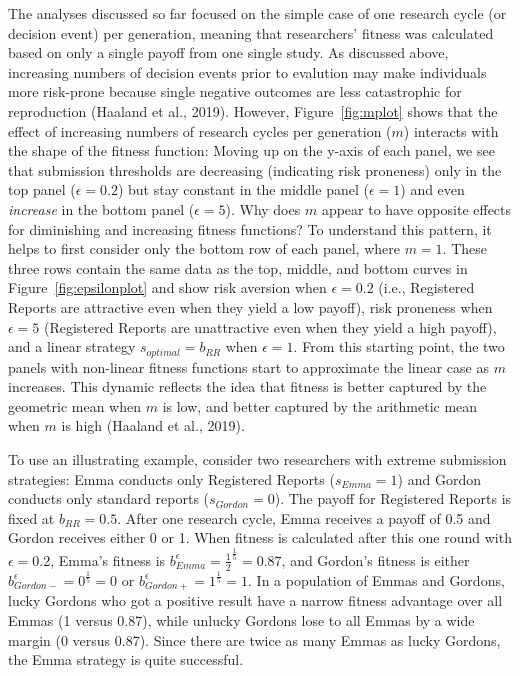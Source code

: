 \documentclass[british,,doc,mask,floatsintext]{apa6}
\begin{document}
The analyses discussed so far focused on the simple case of one research cycle (or decision event) per generation, meaning that researchers' fitness was calculated based on only a single payoff from one single study.
As discussed above, increasing numbers of decision events prior to evalution may make individuals more risk-prone because single negative outcomes are less catastrophic for reproduction (Haaland et al., 2019).
However, Figure~\ref{fig:mplot} shows that the effect of increasing numbers of research cycles per generation (\(m\)) interacts with the shape of the fitness function:
Moving up on the y-axis of each panel, we see that submission thresholds are decreasing (indicating risk proneness) only in the top panel (\(\epsilon = 0.2\)) but stay constant in the middle panel (\(\epsilon = 1\)) and even \emph{increase} in the bottom panel (\(\epsilon = 5\)).
Why does \(m\) appear to have opposite effects for diminishing and increasing fitness functions?
To understand this pattern, it helps to first consider only the bottom row of each panel, where \(m = 1\).
These three rows contain the same data as the top, middle, and bottom curves in Figure~\ref{fig:epsilonplot} and show risk aversion when \(\epsilon = 0.2\) (i.e., Registered Reports are attractive even when they yield a low payoff), risk proneness when \(\epsilon = 5\) (Registered Reports are unattractive even when they yield a high payoff), and a linear strategy \(s_{optimal} = b_{RR}\) when \(\epsilon = 1\).
From this starting point, the two panels with non-linear fitness functions start to approximate the linear case as \(m\) increases.
This dynamic reflects the idea that fitness is better captured by the geometric mean when \(m\) is low, and better captured by the arithmetic mean when \(m\) is high (Haaland et al., 2019).

To use an illustrating example, consider two researchers with extreme submission strategies:
Emma conducts only Registered Reports (\(s_{Emma} = 1\)) and Gordon conducts only standard reports (\(s_{Gordon} = 0\)).
The payoff for Registered Reports is fixed at \(b_{RR} = 0.5\).
After one research cycle, Emma receives a payoff of 0.5 and Gordon receives either 0 or 1.
When fitness is calculated after this one round with \(\epsilon = 0.2\), Emma's fitness is \(b_{Emma}^{\epsilon} = \frac{1}{2}^{\frac{1}{5}} = 0.87\), and Gordon's fitness is either \(b_{Gordon-}^{\epsilon} = 0^{\frac{1}{5}} = 0\) or \(b_{Gordon+}^{\epsilon} = 1^{\frac{1}{5}} = 1\).
In a population of Emmas and Gordons, lucky Gordons who got a positive result have a narrow fitness advantage over all Emmas (1 versus 0.87), while unlucky Gordons lose to all Emmas by a wide margin (0 versus 0.87).
Since there are twice as many Emmas as lucky Gordons, the Emma strategy is quite successful.
\end{document}
